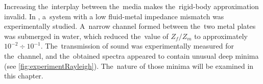 Increasing the~interplay between the~media makes the~rigid-body approximation invalid.
In \cite{adv}, a~system with a low fluid-metal impedance mismatch was experimentally studied.
A~narrow channel formed between the~two metal plates was submerged in water, which reduced the~value of $Z_f/Z_m$ to approximately $10^{-2}\div 10^{-1}$.
The~transmission of sound was experimentally measured for the~channel, and the~obtained spectra appeared to contain unusual deep minima (see \cref{fig:experimentRayleigh}).
The~nature of those minima will be examined in this chapter.



